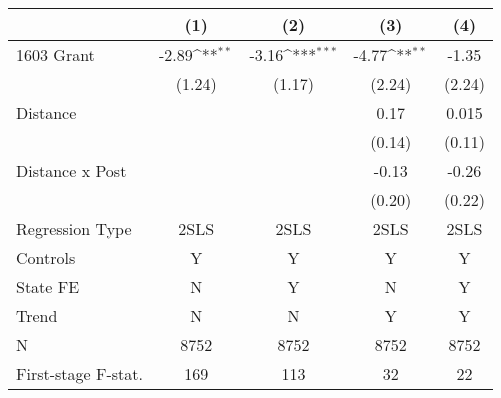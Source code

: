{
\def\sym#1{\ifmmode^{#1}\else\(^{#1}\)\fi}
\begin{tabular}{l*{4}{c}}
\toprule
                &\multicolumn{1}{c}{(1)}         &\multicolumn{1}{c}{(2)}         &\multicolumn{1}{c}{(3)}         &\multicolumn{1}{c}{(4)}         \\
\midrule
1603 Grant      &    -2.89\sym{**} &    -3.16\sym{***}&    -4.77\sym{**} &    -1.35         \\
                &   (1.24)         &   (1.17)         &   (2.24)         &   (2.24)         \\
\addlinespace
Distance        &                  &                  &     0.17         &    0.015         \\
                &                  &                  &   (0.14)         &   (0.11)         \\
\addlinespace
Distance x Post &                  &                  &    -0.13         &    -0.26         \\
                &                  &                  &   (0.20)         &   (0.22)         \\
\midrule
Regression Type &     2SLS         &     2SLS         &     2SLS         &     2SLS         \\
Controls        &        Y         &        Y         &        Y         &        Y         \\
State FE        &        N         &        Y         &        N         &        Y         \\
Trend           &        N         &        N         &        Y         &        Y         \\
N               &     8752         &     8752         &     8752         &     8752         \\
First-stage F-stat.&      169         &      113         &       32         &       22         \\
\bottomrule
\end{tabular}
}
